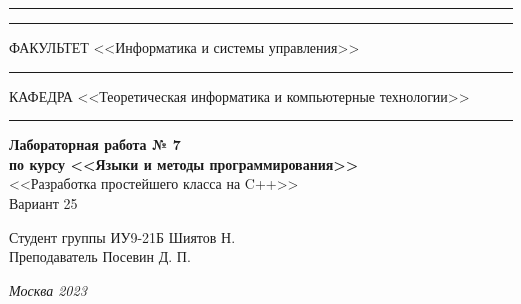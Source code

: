 \documentclass[a4paper, 14pt]{extarticle}
\begin{document}
\begin{titlepage}
\vspace{-25pt}
\hspace{-35pt}\rule{\textwidth}{2.3pt}

\vspace*{-20.3pt}
\hspace{-35pt}\rule{\textwidth}{0.4pt}

\vspace{1.5ex}
\hspace{-35pt} \noindent \small ФАКУЛЬТЕТ\hspace{80pt} <<Информатика и системы управления>>

\vspace*{-16pt}
\hspace{47pt}\rule{0.83\textwidth}{0.4pt}

\vspace{0.5ex}
\hspace{-35pt} \noindent \small КАФЕДРА\hspace{50pt} <<Теоретическая информатика и компьютерные технологии>>

\vspace*{-16pt}
\hspace{30pt}\rule{0.866\textwidth}{0.4pt}
  
\vspace{11em}

\begin{center}
\Large {\bf Лабораторная работа № 7} \\ 
\large {\bf по курсу <<Языки и методы программирования>>} \\
\large <<Разработка простейшего класса на C++>> \\
\Large Вариант 25
\end{center}\normalsize

\vspace{8em}


\begin{flushright}
  {Студент группы ИУ9-21Б Шиятов Н. \hspace*{15pt}\\ 
  \vspace{2ex}
  Преподаватель Посевин Д. П.\hspace*{15pt}}
\end{flushright}

\bigskip

\vfill
 

\begin{center}
\textsl{Москва 2023}
\end{center}
\end{titlepage}
\end{document}
